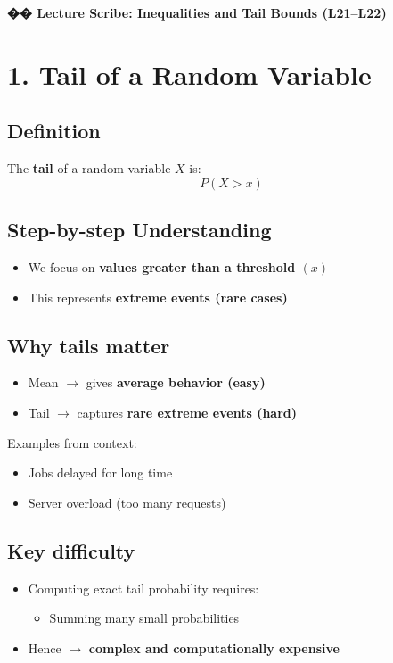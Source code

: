 \documentclass[11pt]{article}
\begin{document}
\begin{center}
{\LARGE \textbf{�� Lecture Scribe: Inequalities and Tail Bounds (L21–L22)}}
\end{center}

\vspace{0.5cm}

\section*{1. Tail of a Random Variable}

\subsection*{Definition}
The \textbf{tail} of a random variable $X$ is:
\[
P(X > x)
\]

\subsection*{Step-by-step Understanding}
\begin{itemize}
\item We focus on \textbf{values greater than a threshold $(x)$}
\item This represents \textbf{extreme events (rare cases)}
\end{itemize}

\subsection*{Why tails matter}
\begin{itemize}
\item Mean $\rightarrow$ gives \textbf{average behavior (easy)}
\item Tail $\rightarrow$ captures \textbf{rare extreme events (hard)}
\end{itemize}

Examples from context:
\begin{itemize}
\item Jobs delayed for long time
\item Server overload (too many requests)
\end{itemize}

\subsection*{Key difficulty}
\begin{itemize}
\item Computing exact tail probability requires:
\begin{itemize}
\item Summing many small probabilities
\end{itemize}
\item Hence $\rightarrow$ \textbf{complex and computationally expensive}
\end{itemize}
\end{document}
